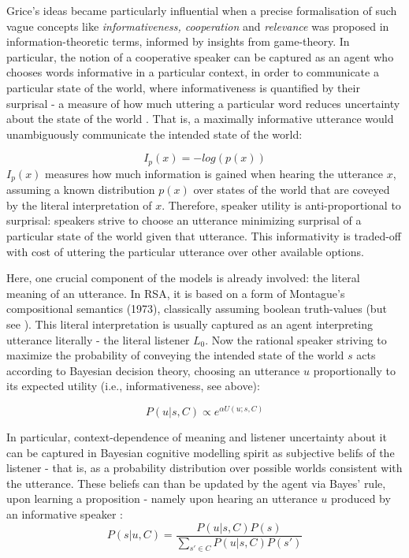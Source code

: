 Grice’s ideas became particularly influential when a precise formalisation of such vague concepts like \emph{informativeness, cooperation} and \emph{relevance} was proposed in information-theoretic terms, informed by insights from game-theory.
In particular, the notion of a cooperative speaker can be captured as an agent who chooses words informative in a particular context, in order to communicate a particular state of the world, where informativeness is quantified by their surprisal - a measure of how much uttering a particular word reduces uncertainty about the state of the world \parencite{frank2012predicting}. That is, a maximally informative utterance would unambiguously communicate the intended state of the world: 

$$I_p(x) = - log(p(x))$$  
$I_p(x)$ measures how much information is gained when hearing the utterance $x$, assuming a known distribution $p(x)$ over states of the world that are coveyed by the literal interpretation of $x$. Therefore, speaker utility is anti-proportional to surprisal: speakers strive to choose an utterance minimizing surprisal of a particular state of the world given that utterance. 
This informativity is traded-off with cost of uttering the particular utterance over other available options. 

Here, one crucial component of the models is already involved: the literal meaning of an utterance. In RSA, it is based on a form of Montague’s compositional semantics (1973), classically assuming boolean truth-values (but see \textcite{degen2020redundancy}). 
This literal interpretation is usually captured as an agent interpreting utterance literally - the literal listener $L_0$. 
Now the rational speaker striving to maximize the probability of conveying the intended state of the world $s$ acts according to Bayesian decision theory, choosing an utterance $u$ proportionally to its expected utility (i.e., informativeness, see above):

$$P(u | s, C) \propto e^{\alpha U (u; s, C)}$$


In particular, context-dependence of meaning and listener uncertainty about it can be captured in Bayesian cognitive modelling spirit as subjective belifs of the listener - that is, as a probability distribution over possible worlds consistent with the utterance. These beliefs can than be updated by the agent via Bayes' rule, upon learning a proposition - namely upon hearing an utterance $u$ produced by an informative speaker \parencite{frank2012predicting}: 
$$P(s | u, C) = \frac{P(u | s, C) P(s)}{\sum_{s' \in C} P(u | s, C) P(s')}$$


